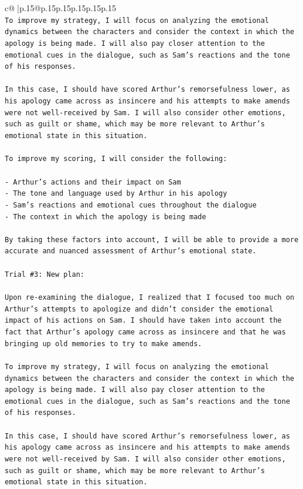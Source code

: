 \documentclass{article}
\begin{document}
{\begin{supertabular}{c@{$\;$}|p{.15\linewidth}@{}p{.15\linewidth}p{.15\linewidth}p{.15\linewidth}p{.15\linewidth}p{.15\linewidth}}
{{{\\ 
\texttt{To improve my strategy, I will focus on analyzing the emotional dynamics between the characters and consider the context in which the apology is being made. I will also pay closer attention to the emotional cues in the dialogue, such as Sam's reactions and the tone of his responses. } \\
\\ 
\texttt{In this case, I should have scored Arthur's remorsefulness lower, as his apology came across as insincere and his attempts to make amends were not well{-}received by Sam. I will also consider other emotions, such as guilt or shame, which may be more relevant to Arthur's emotional state in this situation.} \\
\\ 
\texttt{To improve my scoring, I will consider the following:} \\
\\ 
\texttt{{-} Arthur's actions and their impact on Sam} \\
\texttt{{-} The tone and language used by Arthur in his apology} \\
\texttt{{-} Sam's reactions and emotional cues throughout the dialogue} \\
\texttt{{-} The context in which the apology is being made} \\
\\ 
\texttt{By taking these factors into account, I will be able to provide a more accurate and nuanced assessment of Arthur's emotional state.} \\
\\ 
\texttt{Trial \#3: New plan: } \\
\\ 
\texttt{Upon re{-}examining the dialogue, I realized that I focused too much on Arthur's attempts to apologize and didn't consider the emotional impact of his actions on Sam. I should have taken into account the fact that Arthur's apology came across as insincere and that he was bringing up old memories to try to make amends. } \\
\\ 
\texttt{To improve my strategy, I will focus on analyzing the emotional dynamics between the characters and consider the context in which the apology is being made. I will also pay closer attention to the emotional cues in the dialogue, such as Sam's reactions and the tone of his responses. } \\
\\ 
\texttt{In this case, I should have scored Arthur's remorsefulness lower, as his apology came across as insincere and his attempts to make amends were not well{-}received by Sam. I will also consider other emotions, such as guilt or shame, which may be more relevant to Arthur's emotional state in this situation.} \\
}}}
\end{supertabular}}
\end{document}
